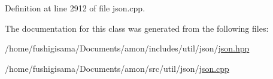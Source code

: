 Definition at line 2912 of file json.\-cpp.



The documentation for this class was generated from the following files\-:\begin{DoxyCompactItemize}
\item 
/home/fushigisama/\-Documents/amon/includes/util/json/\hyperlink{json_8hpp}{json.\-hpp}\item 
/home/fushigisama/\-Documents/amon/src/util/json/\hyperlink{json_8cpp}{json.\-cpp}\end{DoxyCompactItemize}
